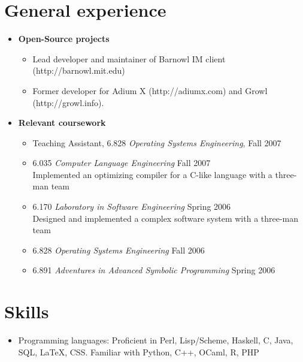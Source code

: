 \documentclass[letterpaper,10pt]{article}
\begin{document}
\section*{General experience}
\vspace*{-0.2cm}
\begin{itemize}
  \item \textbf{Open-Source projects} \\
    \vspace*{-0.5cm}
    \begin{itemize}
      \item Lead developer and maintainer of Barnowl IM client
        (http://barnowl.mit.edu)
      \item Former developer for Adium X (http://adiumx.com) and Growl
        (http://growl.info).
    \end{itemize}

  \item \textbf{Relevant coursework}
  \begin{itemize}
      \item Teaching Assistant, 6.828 {\em Operating Systems Engineering}, Fall 2007
      \item 6.035 {\em Computer Language Engineering} Fall 2007 \\
        Implemented an optimizing compiler for a C-like language with a three-man team
      \item 6.170 {\em Laboratory in Software Engineering} Spring 2006 \\
        Designed and implemented a complex software system with a three-man team
      \item 6.828 {\em Operating Systems Engineering} Fall 2006
      \item 6.891 {\em Adventures in Advanced Symbolic Programming} Spring 2006
  \end{itemize}
\end{itemize}

\section*{Skills}
\vspace*{-0.2cm}
\begin{itemize}
  \item Programming languages: Proficient in Perl, Lisp/Scheme, Haskell,
    C, Java, SQL, \LaTeX, CSS. Familiar with Python, C++, OCaml, R, PHP

\end{itemize}
\end{document}
